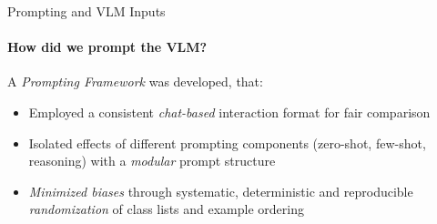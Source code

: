\begin{frame}{Prompting and VLM Inputs}
\framesubtitle{How did we prompt the VLM?}
  \vspace{-1em}
  A \emph{Prompting Framework} was developed, that:
  \begin{itemize}
    \item Employed a consistent \emph{chat-based} interaction format for fair comparison
    \item Isolated effects of different prompting components (zero-shot, few-shot, reasoning) with a \emph{modular} prompt structure
    \item \emph{Minimized biases} through systematic, deterministic and reproducible \emph{randomization} of class lists and example ordering
  \end{itemize}
\end{frame}


